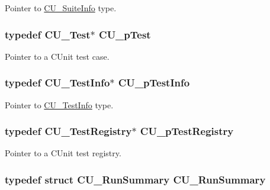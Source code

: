 Pointer to \hyperlink{struct_c_u___suite_info}{C\+U\+\_\+\+Suite\+Info} type. 

\hypertarget{group___framework_ga249c43fbe4e53452b3f90db1437da04b}{
\subsubsection[{C\+U\+\_\+p\+Test}]{\setlength{\rightskip}{0pt plus 5cm}typedef {\bf C\+U\+\_\+\+Test}$\ast$ {\bf C\+U\+\_\+p\+Test}}}\label{group___framework_ga249c43fbe4e53452b3f90db1437da04b}


Pointer to a C\+Unit test case. 

\hypertarget{group___framework_ga146a57ac2abef6382399be83afb1daed}{
\subsubsection[{C\+U\+\_\+p\+Test\+Info}]{\setlength{\rightskip}{0pt plus 5cm}typedef {\bf C\+U\+\_\+\+Test\+Info}$\ast$ {\bf C\+U\+\_\+p\+Test\+Info}}}\label{group___framework_ga146a57ac2abef6382399be83afb1daed}


Pointer to \hyperlink{struct_c_u___test_info}{C\+U\+\_\+\+Test\+Info} type. 

\hypertarget{group___framework_ga2a416821761e04581a70c41ae3587d5c}{
\subsubsection[{C\+U\+\_\+p\+Test\+Registry}]{\setlength{\rightskip}{0pt plus 5cm}typedef {\bf C\+U\+\_\+\+Test\+Registry}$\ast$ {\bf C\+U\+\_\+p\+Test\+Registry}}}\label{group___framework_ga2a416821761e04581a70c41ae3587d5c}


Pointer to a C\+Unit test registry. 

\hypertarget{group___framework_gaccf591ac5a134c3ba3a1becb7d469094}{
\subsubsection[{C\+U\+\_\+\+Run\+Summary}]{\setlength{\rightskip}{0pt plus 5cm}typedef struct {\bf C\+U\+\_\+\+Run\+Summary}  {\bf C\+U\+\_\+\+Run\+Summary}}}\label{group___framework_gaccf591ac5a134c3ba3a1becb7d469094}


